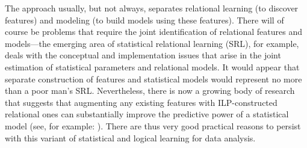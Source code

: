 %
%
\noindent
%
%

The approach usually, but not always, separates relational learning
(to discover features) and modeling
(to build models using these features). There will of course
be problems that require the joint identification of relational
features and models---the emerging area of statistical relational
learning (SRL), for example, deals with the conceptual and implementation issues
that arise in the joint estimation of statistical parameters and relational
models. It would appear that separate construction of features
and statistical models would represent no more than a poor man's SRL.
Nevertheless, there is now a growing body of
research that suggests that augmenting any existing
features with ILP-constructed relational ones can substantially
improve the predictive power of a statistical model
(see, for example: \cite{JoshiRS08,Amrita12,Specia_09,RamakrishnanJBS07,SpeciaSRN06}).
There are thus  very good practical reasons to persist with this variant of
statistical and logical learning for data analysis.

